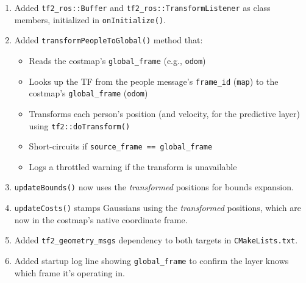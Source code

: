 \documentclass[11pt]{article}
\begin{document}
\begin{enumerate}
  \item Added \texttt{tf2\_ros::Buffer} and \texttt{tf2\_ros::TransformListener}
    as class members, initialized in \texttt{onInitialize()}.
  \item Added \texttt{transformPeopleToGlobal()} method that:
    \begin{itemize}
      \item Reads the costmap's \texttt{global\_frame} (e.g., \texttt{odom})
      \item Looks up the TF from the people message's \texttt{frame\_id}
        (\texttt{map}) to the costmap's \texttt{global\_frame}
        (\texttt{odom})
      \item Transforms each person's position (and velocity, for the predictive
        layer) using \texttt{tf2::doTransform()}
      \item Short-circuits if \texttt{source\_frame == global\_frame}
      \item Logs a throttled warning if the transform is unavailable
    \end{itemize}
  \item \texttt{updateBounds()} now uses the \emph{transformed} positions for
    bounds expansion.
  \item \texttt{updateCosts()} stamps Gaussians using the \emph{transformed}
    positions, which are now in the costmap's native coordinate frame.
  \item Added \texttt{tf2\_geometry\_msgs} dependency to both targets in
    \texttt{CMakeLists.txt}.
  \item Added startup log line showing \texttt{global\_frame} to confirm the
    layer knows which frame it's operating in.
\end{enumerate}
\end{document}
